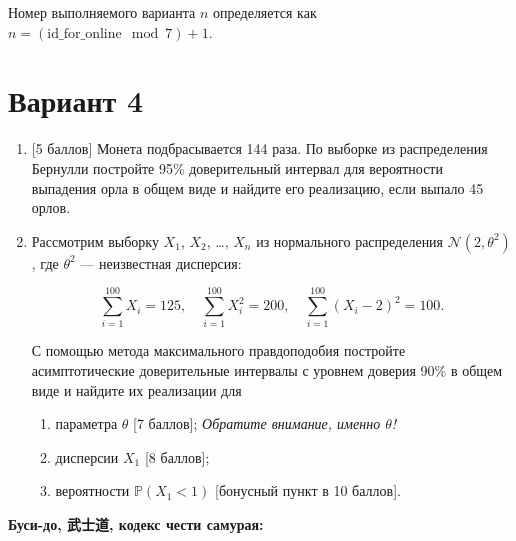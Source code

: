 \documentclass[12pt]{article}
\def \cN{\mathcal{N}}
\def \P{\mathbb{P}}
\newcommand \id {\mathrm{id}\_\mathrm{for}\_\mathrm{online}}
\begin{document}
\newpage
Номер выполняемого варианта $n$ определяется как $n=(\id \mod 7)+1$. 

\section*{Вариант 4}


\begin{enumerate}

  \item {[5 баллов]} Монета подбрасывается 144 раза. По выборке из распределения Бернулли
  постройте 95\% доверительный интервал для вероятности выпадения орла в общем виде и найдите его
  реализацию, если выпало 45 орлов.
  
  \item Рассмотрим выборку $X_1$, $X_2$, \ldots, $X_n$ из нормального распределения $\cN(2, \theta^2)$, 
  где $\theta^2$ — неизвестная дисперсия:
  
  \[
  \sum_{i=1}^{100} X_i = 125, \quad \sum_{i=1}^{100} X_i^2 = 200, 
  \quad \sum_{i=1}^{100} (X_i - 2)^2 = 100.  
  \]
  
  С помощью метода максимального правдоподобия 
  постройте асимптотические доверительные интервалы с уровнем доверия 90\% в общем виде и найдите их реализации для  
  
  \begin{enumerate}
    \item параметра $\theta$ {[7 баллов]}; \textit{Обратите внимание, именно $\theta$!}
    \item дисперсии $X_1$ {[8 баллов]};
    \item вероятности $\P(X_1 < 1)$ {[бонусный пункт в 10 баллов]}.
  \end{enumerate}
  
\end{enumerate}
    
\textbf{Буси-до, 武士道, кодекс чести самурая:}

\vspace{5mm}
\end{document}
